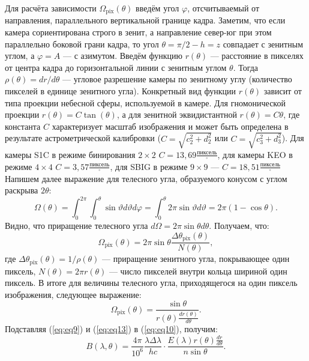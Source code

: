 \documentclass[12pt,a4paper]{article}
\begin{document}
Для расчёта зависимости $\Omega_{\text{pix}}(\theta)$ введём угол $\varphi$, отсчитываемый от направления, параллельного вертикальной границе кадра. Заметим, что если камера сориентирована строго в зенит, а направление север-юг при этом параллельно боковой грани кадра, то угол $\theta=\pi / 2 - h = z$ совпадает с зенитным углом, а $\varphi = A$ --- с азимутом. Введём функцию $r(\theta)$ --- расстояние в пикселях от центра кадра до горизонтальной линии с зенитным углом $\theta$. Тогда $\rho(\theta)=dr/d\theta$ --- угловое разрешение камеры по зенитному углу (количество пикселей в единице зенитного угла). Конкретный вид функции $r(\theta)$ зависит от типа проекции небесной сферы, используемой в камере. Для гномонической проекции $r(\theta)=C \tan (\theta)$, а для зенитной эквидистантной $r(\theta)=C\theta$, где константа $C$ характеризует масштаб изображения и может быть определена в результате астрометрической калибровки ($C=\sqrt{c_2^2+d_2^2}$ или $C=\sqrt{c_3^2+d_3^2}$). Для камеры S1C в режиме бинирования $2\times2$ $C=13,69 \frac{\text{пиксель}}{^{\circ}}$, для камеры KEO в режиме $4\times4$ $C= 3,57 \frac{\text{пиксель}}{^{\circ}}$, для SBIG в режиме $9\times9$ --- $C=18,51 \frac{\text{пиксель}}{^{\circ}}$   Напишем далее выражение для телесного угла, образуемого конусом с углом раскрыва $2\theta$:
\begin{equation}\label{eq:eq11}
\Omega (\theta)= \int_{0}^{2\pi} \int_{0}^{\theta} \sin\vartheta d\vartheta d\varphi = \int_{0}^{\theta} 2\pi\sin{\vartheta} d\vartheta=2\pi(1-\cos\theta).
\end{equation}
Видно, что приращение телесного угла $d\Omega = 2\pi\sin{\theta}d\theta$. Получаем, что:  
\begin{equation}\label{eq:eq12}
\Omega_\text{pix} (\theta)= 2\pi\sin{\theta} \frac{\Delta\theta_\text{pix}(\theta)}{N(\theta)},
\end{equation}
где $\Delta\theta_\text{pix}(\theta)=1/\rho(\theta)$ --- приращение зенитного угла, покрывающее один пиксель, $N(\theta) = 2\pi r(\theta)$ --- число пикселей внутри кольца шириной один пиксель. В итоге для величины телесного угла, приходящегося на один пиксель изображения, следующее выражение:
\begin{equation}\label{eq:eq13}
\Omega_\text{pix} (\theta)= \frac{\sin{\theta}}{r(\theta) \frac{dr(\theta)}{d\theta}}.
\end{equation}
Подставляя (\ref{eq:eq9}) и (\ref{eq:eq13}) в (\ref{eq:eq10}), получим:
\begin{equation}\label{eq:eq14}
B(\lambda,\theta) = \frac {4\pi}{10^6} \frac{\lambda\Delta\lambda}{hc}\cdot \frac{E(\lambda) r(\theta)\frac{dr}{d\theta}} {n \sin\theta}.
\end{equation}
\end{document}
